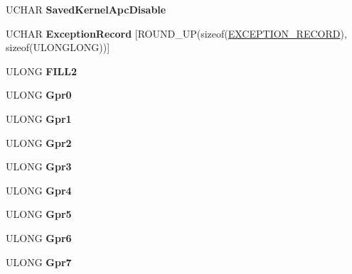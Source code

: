\begin{DoxyCompactItemize}
U\+C\+H\+AR {\bfseries Saved\+Kernel\+Apc\+Disable}
\item 
\mbox{\label{struct___k_t_r_a_p___f_r_a_m_e_ae082ed7f15817210cbdbeb3ff373a46f}} 
U\+C\+H\+AR {\bfseries Exception\+Record} \mbox{[}R\+O\+U\+N\+D\+\_\+\+UP(sizeof(\hyperlink{struct___e_x_c_e_p_t_i_o_n___r_e_c_o_r_d}{E\+X\+C\+E\+P\+T\+I\+O\+N\+\_\+\+R\+E\+C\+O\+RD}), sizeof(U\+L\+O\+N\+G\+L\+O\+NG))\mbox{]}
\item 
\mbox{\label{struct___k_t_r_a_p___f_r_a_m_e_a91774b5f1d3d0e9f3a7e574f278ba47f}} 
U\+L\+O\+NG {\bfseries F\+I\+L\+L2}
\item 
\mbox{\label{struct___k_t_r_a_p___f_r_a_m_e_a195f496bdbd75d913d8d2ee4b13500dd}} 
U\+L\+O\+NG {\bfseries Gpr0}
\item 
\mbox{\label{struct___k_t_r_a_p___f_r_a_m_e_a4e6020817e5fd233c6293d6f1062730c}} 
U\+L\+O\+NG {\bfseries Gpr1}
\item 
\mbox{\label{struct___k_t_r_a_p___f_r_a_m_e_ac4518d2d2f3ba02b470a1e5ccf61f7bc}} 
U\+L\+O\+NG {\bfseries Gpr2}
\item 
\mbox{\label{struct___k_t_r_a_p___f_r_a_m_e_ae7b448fc0b92eb9b32f20fb0f9141f33}} 
U\+L\+O\+NG {\bfseries Gpr3}
\item 
\mbox{\label{struct___k_t_r_a_p___f_r_a_m_e_a28483ac7c3fe338eceb703e3bcbfce14}} 
U\+L\+O\+NG {\bfseries Gpr4}
\item 
\mbox{\label{struct___k_t_r_a_p___f_r_a_m_e_a13b69e6a104446efc723c80640163b35}} 
U\+L\+O\+NG {\bfseries Gpr5}
\item 
\mbox{\label{struct___k_t_r_a_p___f_r_a_m_e_aae7340f62108007daf564f9ecccca2b8}} 
U\+L\+O\+NG {\bfseries Gpr6}
\item 
\mbox{\label{struct___k_t_r_a_p___f_r_a_m_e_a9605fd97833303669601ae1fa2262318}} 
U\+L\+O\+NG {\bfseries Gpr7}

\end{DoxyCompactItemize}
